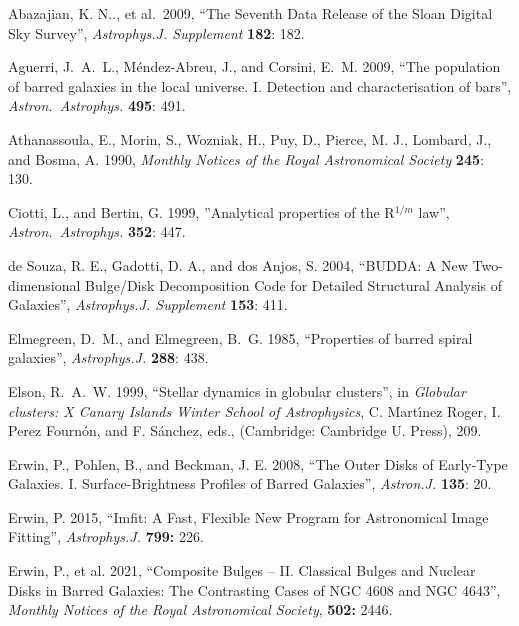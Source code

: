 \documentclass[10pt,a4paper,article]{memoir}
\begin{document}
\begin{thebibliography}{}


 Abazajian, K. N.., et al.\ 2009, ``The Seventh 
Data Release of the Sloan Digital Sky Survey'', \textit{Astrophys.J. Supplement} \textbf{182}: 182.

Aguerri, J.~A.~L., M{\'e}ndez-Abreu, J., and Corsini, E.~M. 2009, ``The
population of barred galaxies in the local universe. I. Detection and
characterisation of bars'', \textit{Astron.\ Astrophys.} \textbf{495}:
491.

 Athanassoula, E., Morin, S., Wozniak, H.,
Puy, D., Pierce, M. J., Lombard, J., and Bosma, A. 1990, \textit{Monthly Notices of the Royal
Astronomical Society} \textbf{245}: 130.

 Ciotti, L., and Bertin, G. 1999,
''Analytical properties of the R$^{1/m}$ law'', \textit{Astron.\ Astrophys.}
\textbf{352}: 447.

 de Souza, R. E.,
Gadotti, D. A., and dos Anjos, S. 2004, ``BUDDA: A New Two-dimensional Bulge/Disk
Decomposition Code for Detailed Structural Analysis of Galaxies'',
\textit{Astrophys.J. Supplement} \textbf{153}: 411.

 Elmegreen, D.~M., and
Elmegreen, B.~G. 1985, ``Properties of barred spiral galaxies'',
\textit{Astrophys.J.} \textbf{288}: 438.

 Elson, R.~A.~W. 1999, ``Stellar dynamics
in globular clusters'', in \textit{Globular clusters: X Canary Islands
Winter School of Astrophysics}, C. Mart{\'{\i}}nez Roger, I. Perez
Fourn{\'o}n, and F. S{\'a}nchez, eds., (Cambridge: Cambridge U. Press),
209.

 Erwin, P.,
Pohlen, B., and Beckman, J. E. 2008, ``The Outer Disks of Early-Type Galaxies. I. 
Surface-Brightness Profiles of Barred Galaxies'', \textit{Astron.J.} \textbf{135}: 20.

 Erwin, P. 2015, ``Imfit: A Fast, Flexible
New Program for Astronomical Image Fitting'', \textit{Astrophys.J.} \textbf{799:} 226.

 Erwin, P., et al. 2021,
``Composite Bulges – II. Classical Bulges and Nuclear Disks in Barred
Galaxies: The Contrasting Cases of NGC 4608 and NGC 4643'',
\textit{Monthly Notices of the Royal Astronomical Society}, \textbf{502:} 2446.


\end{thebibliography}
\end{document}
